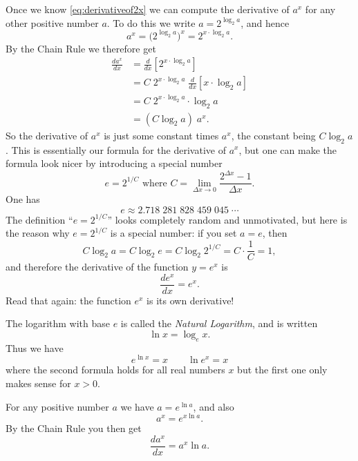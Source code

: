 Once we know \eqref{eq:derivativeof2x} we can compute the derivative of $a^x$
for any other positive number $a$. To do this we write $a=2^{\log_2 a}$,
and hence
\[
a^x = \bigl( 2^{\log_2 a} \bigr)^x = 2^{x\cdot \log_2 a}.
\]
By the Chain Rule we therefore get
\begin{align*}
  \frac{da^x}{dx} &= \frac{d}{dx}\left[2^{x\cdot \log_2 a}\right] \\
  &= C\;2^{x\cdot \log_2 a}\; \frac{d}{dx}\left[x\cdot \log_2 a\right] \\
  &=C\;2^{x\cdot \log_2 a}\cdot \log_2 a \\
  &= (C\log_2 a) \;a^x.
\end{align*}
So the derivative of $a^x$ is just some constant times $a^x$, the constant being
$C\log_2a$.  This is essentially our formula for the derivative of $a^x$, but
one can make the formula look nicer by introducing a special number
\[
e=2^{1/C}\text{ where  }
C=\lim_{ \Delta x\to0} \frac{2^{ \Delta x} - 1}{ \Delta x}.
\]
One has
\[
e\approx 2.718\;281\;828\;459\;045\;\cdots
\]
The definition ``$e = 2^{1/C}$'' looks completely random and
unmotivated, but here is the reason why $e=2^{1/C}$ is a special
number: if you set $a=e$, then
\[
C\log_2 a = C\log_2 e = C\log_2 2^{1/C} = C\cdot \frac1C =1,
\]
and therefore the derivative of the function $y=e^x$ is
\begin{equation}
  \label{eq:derivative-of-ex}
  \frac{de^x}{dx} = e^x.
\end{equation}
Read that again: the function $e^x$ is its own derivative!




The logarithm with base $e$ is called the \emph{Natural Logarithm},
and is written
\[
\ln x = \log_e x.
\]
Thus we have
\begin{equation}
  e^{\ln x}  = x \qquad  \ln e^x = x
\end{equation}
where the second formula holds for all real numbers $x$ but the first one
only makes sense for $x>0$.




For any positive number $a$ we have $a=e^{\ln a}$, and also
\[
a^x = e^{x\ln a}.
\]
By the Chain Rule you then get
\begin{equation}
  \label{eq:derivative-of-ax}
  \dfrac{da^x}{dx} = a^x\ln a.
\end{equation}




